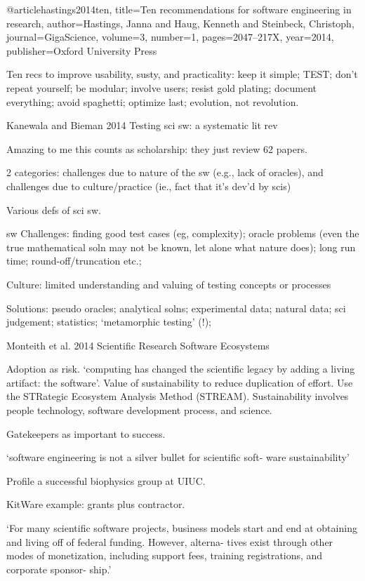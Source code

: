 \documentclass[12pt]{amsart}
\begin{document}
@article{hastings2014ten,
  title={Ten recommendations for software engineering in research},
  author={Hastings, Janna and Haug, Kenneth and Steinbeck, Christoph},
  journal={GigaScience},
  volume={3},
  number={1},
  pages={2047--217X},
  year={2014},
  publisher={Oxford University Press}
}

Ten recs to improve usability, susty, and practicality: keep it simple; TEST; don't repeat yourself; be modular; involve users; resist gold plating; document everything; avoid spaghetti; optimize last; evolution, not revolution.




Kanewala and Bieman 2014 Testing sci sw: a systematic lit rev

Amazing to me this counts as scholarship: they just review 62 papers.

2 categories: challenges due to nature of the sw (e.g., lack of oracles), and challenges due to culture/practice (ie., fact that it's dev'd by scis)

Various defs of sci sw.

sw Challenges: finding good test cases (eg, complexity); oracle problems (even the true mathematical soln may not be known, let alone what nature does); long run time; round-off/truncation etc.; 

Culture: limited understanding and valuing of testing concepts or processes

Solutions: pseudo oracles; analytical solns; experimental data; natural data; sci judgement; statistics; `metamorphic testing' (!); 


Monteith et al. 2014 Scientific Research Software Ecosystems

Adoption as risk. `computing has changed the scientific legacy by adding a living artifact: the software'. Value of sustainability to reduce duplication of effort. Use the STRategic Ecosystem Analysis Method (STREAM). Sustainability involves people technology, software development process, and science. 

Gatekeepers as important to success. 

`software engineering is not a silver bullet for scientific soft- ware sustainability'

Profile a successful biophysics group at UIUC. 

KitWare example: grants plus contractor.

`For many scientific software projects, business models start and end at obtaining and living off of federal funding. However, alterna- tives exist through other modes of monetization, including support fees, training registrations, and corporate sponsor- ship.'
\end{document}
